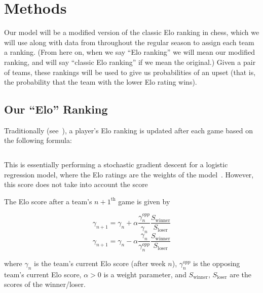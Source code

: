 \documentclass{article}
\begin{document}
\section{Methods}

Our model will be a modified version of the classic Elo ranking in chess, which we will use along with data from throughout the regular season to assign each team a ranking. (From here on, when we say ``Elo ranking'' we will mean our modified ranking, and will say ``classic Elo ranking'' if we mean the original.) Given a pair of teams, these rankings will be used to give us probabilities of an upset (that is, the probability that the team with the lower Elo rating wins). 


\subsection{Our ``Elo'' Ranking}
Traditionally (see~\cite{mediumRatingSystem}), a player's Elo ranking is updated after each game based on the following formula:

\[
\]

This is essentially performing a stochastic gradient descent for a logistic regression model, where the Elo ratings are the weights of the model~\cite{stmorseStatisticalLearning}. 
However, this score does not take into account the score 

The Elo score after a team's $n+1^{\text{th}}$ game is given by

\[
\gamma_{n+1} = \gamma_n + \alpha\frac{\gamma^{opp}_n}{\gamma_n}\frac{S_{\text{winner}}}{S_{\text{loser}}}
\]
\[
\gamma_{n+1} = \gamma_n - \alpha\frac{\gamma_n}{\gamma^{opp}_n}\frac{S_{\text{winner}}}{S_{\text{loser}}}
\]

where $\gamma_n$ is the team's current Elo score (after week $n$), $\gamma^{opp}_n$ is the opposing team's current Elo score, $\alpha > 0$ is a weight parameter, and $S_{\text{winner}}$, $S_{\text{loser}}$ are the scores of the winner/loser.
\end{document}
